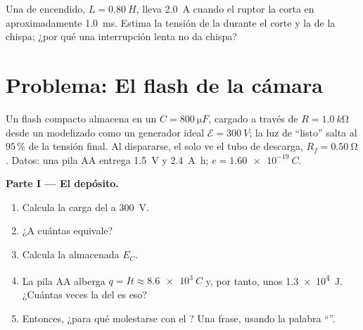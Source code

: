 \begin{exercise}[$\star\star\star$]\label{exo:g12:rc-rl-circuits:15}
Una  de encendido, $L = \qty{0.80}{H}$, lleva \qty{2.0}{A} cuando el ruptor la
corta en aproximadamente \qty{1.0}{ms}. Estima la tensión de la  durante el
corte y la  de la chispa; ¿por qué una interrupción lenta no da chispa?
\end{exercise}

\section{Problema: El flash de la cámara}

\begin{problem}
\label{pb:g12:rc-rl-circuits:1}
Un flash compacto almacena  en un  $C = \qty{800}{\micro F}$,
cargado a través de $R = \qty{1.0}{k\ohm}$ desde un  modelizado como un
generador ideal $\mathcal{E} = \qty{300}{V}$; la luz de ``listo'' salta al $95\,\%$ de
la tensión final. Al dispararse, el  solo ve el tubo de descarga,
$R_f = \qty{0.50}{\ohm}$. Datos: una pila AA entrega \qty{1.5}{V} y \qty{2.4}{A.h};
$e = \qty{1.60e-19}{C}$.

\medskip
\noindent\textbf{Parte I --- El depósito.}
\begin{enumerate}
  \item Calcula la carga del  a \qty{300}{V}.
  \item ¿A cuántas  equivale?
  \item Calcula la  almacenada $E_C$.
  \item La pila AA alberga $q = It \approx \qty{8.6e3}{C}$ y, por tanto, unos
        \qty{1.3e4}{J}. ¿Cuántas veces la  del  es eso?
  \item Entonces, ¿para qué molestarse con el ? Una frase, usando la
        palabra ``''.
\end{enumerate}


\end{problem}
